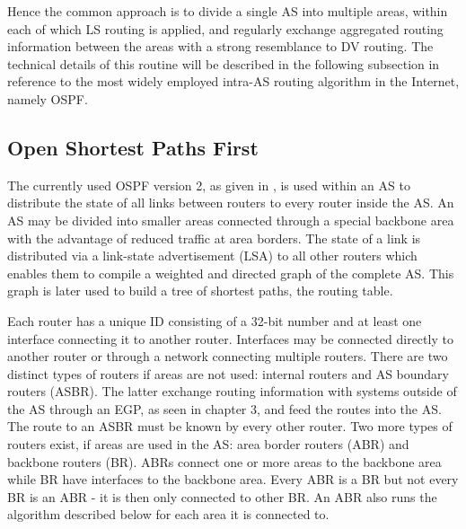 \documentclass{acm_proc_article-sp}
\begin{document}
Hence the common approach is to divide a single AS into multiple areas, within each of which LS routing is applied, and regularly exchange aggregated routing information between the areas with a strong resemblance to DV routing. The technical details of this routine will be described in the following subsection in reference to the most widely employed intra-AS routing algorithm in the Internet, namely OSPF.

\subsection{Open Shortest Paths First}

The currently used OSPF version 2, as given in \cite{RFC1247}, is used within an AS to distribute the state of all links between routers to every router inside the AS. An AS may be divided into smaller areas connected through a special backbone area with the advantage of reduced traffic at area borders. The state of a link is distributed via a link-state advertisement (LSA) to all other routers which enables them to compile a weighted and directed graph of the complete AS. This graph is later used to build a tree of shortest paths, the routing table.


Each router has a unique ID consisting of a 32-bit number and at least one interface connecting it to another router. Interfaces may be connected directly to another router or through a network connecting multiple routers. There are two distinct types of routers if areas are not used: internal routers and AS boundary routers (ASBR). The latter exchange routing information with systems outside of the AS through an EGP, as seen in chapter 3, and feed the routes into the AS. The route to an ASBR must be known by every other router. Two more types of routers exist, if areas are used in the AS: area border routers (ABR) and backbone routers (BR). ABRs connect one or more areas to the backbone area while BR have interfaces to the backbone area. Every ABR is a BR but not every BR is an ABR - it is then only connected to other BR. An ABR also runs the algorithm described below for each area it is connected to.
\end{document}
